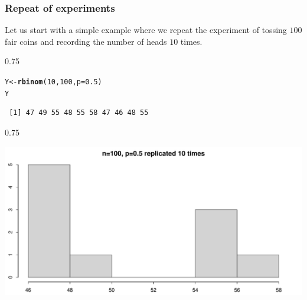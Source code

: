 \documentclass{beamer}\usepackage[]{graphicx}\usepackage[]{color}
\makeatletter
\newcommand{\hlnum}[1]{\textcolor[rgb]{0.2,0.2,0.2}{#1}}%
\newcommand{\hlstd}[1]{\textcolor[rgb]{0.102,0.102,0.102}{#1}}%
\newcommand{\hlkwb}[1]{\textcolor[rgb]{0.102,0.102,0.102}{#1}}%
\newcommand{\hlkwc}[1]{\textcolor[rgb]{0.2,0.2,0.2}{#1}}%
\newcommand{\hlkwd}[1]{\textcolor[rgb]{0.102,0.102,0.102}{\textbf{#1}}}%
\newenvironment{kframe}{%
 \def\at@end@of@kframe{}%
 \ifinner\ifhmode%
  \def\at@end@of@kframe{\end{minipage}}%
  \begin{minipage}{\columnwidth}%
 \fi\fi%
 \def\FrameCommand##1{\hskip\@totalleftmargin \hskip-\fboxsep
 \colorbox{shadecolor}{##1}\hskip-\fboxsep
     \hskip-\linewidth \hskip-\@totalleftmargin \hskip\columnwidth}%
 \MakeFramed {\advance\hsize-\width
   \@totalleftmargin\z@ \linewidth\hsize
   \@setminipage}}%
 {\par\unskip\endMakeFramed%
 \at@end@of@kframe}
\newenvironment{knitrout}{}{} %
\renewenvironment{knitrout}{\begin{spacing}{0.75}\begin{tiny}}{\end{tiny}\end{spacing}}
\makeatother
\begin{document}
\begin{frame}[fragile]
\frametitle{Repeat of experiments}

Let us start with a simple example where we repeat the experiment of tossing
$100$ fair coins and recording the number of heads $10$ times.

\begin{knitrout}\small
{}\color{fgcolor}\begin{kframe}
\begin{alltt}
\hlstd{Y} \hlkwb{<-} \hlkwd{rbinom}\hlstd{(}\hlnum{10}\hlstd{,} \hlnum{100}\hlstd{,} \hlkwc{p}\hlstd{=}\hlnum{0.5}\hlstd{)}
\hlstd{Y}
\end{alltt}
\begin{verbatim}
 [1] 47 49 55 48 55 58 47 46 48 55
\end{verbatim}
\end{kframe}
\end{knitrout}

\end{frame}

\begin{frame}[fragile]

\begin{knitrout}\small
{}\color{fgcolor}

{\centering \includegraphics[width=0.89\linewidth]{figure/graphics-unnamed-chunk-2-1} 

}



\end{knitrout}

\end{frame}
\end{document}
